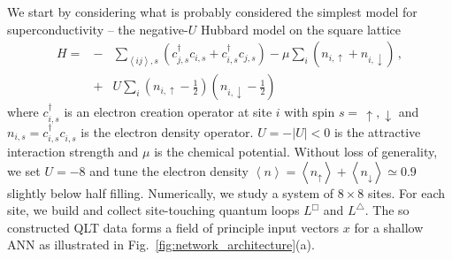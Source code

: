 \documentclass[amsmath,amssymb, aps, prx, longbibliography, twocolumn]{revtex4-1}
\begin{document}
We start by considering what is probably considered the simplest model for superconductivity -- the negative-$U$ Hubbard model on the square lattice \cite{Scalettar1989, Scalapino1992}
\begin{eqnarray}
H = &-&\underset{\left\langle ij \right\rangle, s}{\sum} \left( c^\dagger_{j,s}c_{i,s} +  c^\dagger_{i,s}c_{j,s} \right) -  \mu\underset{i}{\sum} \left(n_{i,\uparrow} +n_{i,\downarrow}\right) \,, \nonumber\\
&+& U \underset{i}{\sum} \left(n_{i,\uparrow}-\frac{1}{2}\right) \left(n_{i,\downarrow}-\frac{1}{2}\right)
\label{eq:hubbard}
\end{eqnarray}
where $c^\dagger_{i,s}$ is an electron creation operator at site $i$ with spin $s =\, \uparrow, \downarrow$  and $n_{i,s}=c^\dagger_{i,s}c^{\phantom\dagger}_{i,s}$ is the electron density operator. $U=-\left|U\right|<0$ is the attractive interaction strength and $\mu$ is the chemical potential.  Without loss of generality, we set $U=-8$ and tune the electron density $\left\langle n\right\rangle = \left\langle n_\uparrow\right\rangle+ \left\langle n_\downarrow\right\rangle  \simeq 0.9$ slightly below half filling. 
Numerically, we study a system of $8\times 8$ sites. For each site, we  build and collect site-touching quantum loops $L^\Box$ and $ L^\triangle$. The so constructed QLT data forms a field of principle input vectors $x$ for a shallow ANN as illustrated in Fig.~\ref{fig:network_architecture}(a). 
\end{document}

